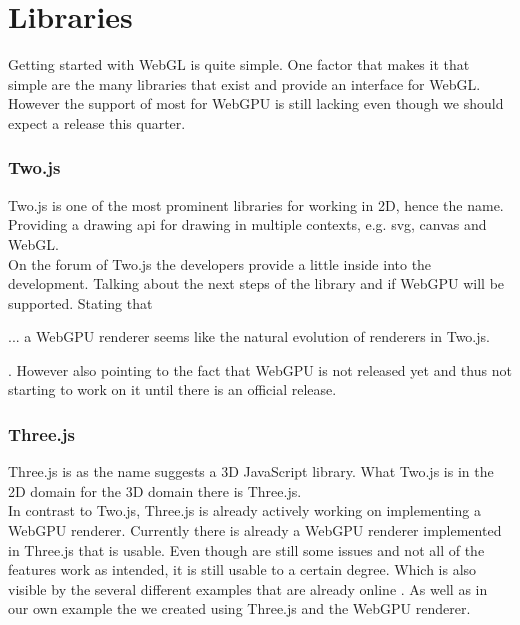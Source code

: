 %
%
% 
% 

\chapter{Libraries}

\label{chap:Libraries}

Getting started with WebGL is quite simple. 
One factor that makes it that simple are the many libraries that exist and provide an interface for WebGL.
However the support of most for WebGPU is still lacking even though we should expect a release this quarter.

\subsection{Two.js}

Two.js is one of the most prominent libraries for working in 2D, hence the name.
Providing a drawing api for drawing in multiple contexts, e.g. svg, canvas and WebGL.\\
On the forum of Two.js the developers provide a little inside into the development.
Talking about the next steps of the library and if WebGPU will be supported.
Stating that \begin{displayquote} ... a WebGPU renderer seems like the natural evolution of renderers in Two.js. \end{displayquote}\cite{two_quote}.
However also pointing to the fact that WebGPU is not released yet and thus not starting to work on it until there is an official release.

\subsection{Three.js}

Three.js is as the name suggests a 3D JavaScript library. 
What Two.js is in the 2D domain for the 3D domain there is Three.js.\\
In contrast to Two.js, Three.js is already actively working on implementing a WebGPU renderer.
Currently there is already a WebGPU renderer implemented in Three.js that is usable. 
Even though are still some issues and not all of the features work as intended, it is still usable to a certain degree.
Which is also visible by the several different examples that are already online \cite{three_examples}.
As well as in our own example the we created using Three.js and the WebGPU renderer.

